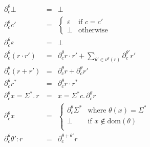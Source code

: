 \documentclass[11pt]{amsart}
\begin{document}
$$
\begin{array}{rcl}
\partial_c^\theta \bot &=& \bot \\
\partial_c^\theta c' &=&
	\begin{cases}
	\varepsilon & \textrm{if } c = c' \\
	\bot & \textrm{otherwise}
	\end{cases} \\
\partial_c^\theta \varepsilon &=& \bot \\
\partial_c^\theta (r\cdot r') &=&
	\partial_c^\theta r\cdot r' +
	\sum_{\theta' \in \nu^\theta(r)} \partial_c^{\theta'} r' \\
\partial_c^\theta (r + r') &=& \partial_c^\theta r + \partial_c^\theta r' \\
\partial_c^\theta r^* &=& \partial_c^\theta r\cdot r^* \\
\partial_c^\theta x{=}\Sigma^*.\,r &=& x{=}\Sigma^*c.\,\partial_c^\theta r \\
\partial_c^\theta x &=&
	\begin{cases}
	\partial_c^\theta \Sigma^* & \textrm{where }\theta(x)=\Sigma^* \\
	\bot & \textrm{if } x \notin \mathrm{dom}(\theta) \\
	\end{cases} \\
\partial_c^\theta \theta'{: r} &=& \partial_c^{\theta + \theta'}r \\
\end{array}
$$
\end{document}
